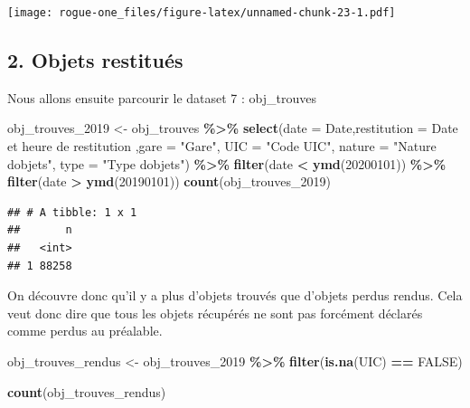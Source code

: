 \documentclass[
]{article}
\newenvironment{Shaded}{\begin{snugshade}}{\end{snugshade}}
\newcommand{\AttributeTok}[1]{\textcolor[rgb]{0.13,0.29,0.53}{#1}}
\newcommand{\ConstantTok}[1]{\textcolor[rgb]{0.56,0.35,0.01}{#1}}
\newcommand{\DecValTok}[1]{\textcolor[rgb]{0.00,0.00,0.81}{#1}}
\newcommand{\FunctionTok}[1]{\textcolor[rgb]{0.13,0.29,0.53}{\textbf{#1}}}
\newcommand{\NormalTok}[1]{#1}
\newcommand{\OtherTok}[1]{\textcolor[rgb]{0.56,0.35,0.01}{#1}}
\newcommand{\SpecialCharTok}[1]{\textcolor[rgb]{0.81,0.36,0.00}{\textbf{#1}}}
\newcommand{\StringTok}[1]{\textcolor[rgb]{0.31,0.60,0.02}{#1}}
\begin{document}
\texttt{[image: rogue-one\_files/figure-latex/unnamed-chunk-23-1.pdf]}

\hypertarget{objets-restituuxe9s}{%
\subsection{2. Objets restitués}\label{objets-restituuxe9s}}

Nous allons ensuite parcourir le dataset 7 : obj\_trouves

\begin{Shaded}
\begin{Highlighting}[]
\NormalTok{obj\_trouves\_2019 }\OtherTok{\textless{}{-}}\NormalTok{ obj\_trouves }\SpecialCharTok{\%\textgreater{}\%}
  \FunctionTok{select}\NormalTok{(}\AttributeTok{date =} \StringTok{\textasciigrave{}}\AttributeTok{Date}\StringTok{\textasciigrave{}}\NormalTok{,}\AttributeTok{restitution =} \StringTok{\textasciigrave{}}\AttributeTok{Date et heure de restitution}\StringTok{\textasciigrave{}}\NormalTok{ ,}\AttributeTok{gare =} \StringTok{"Gare"}\NormalTok{, }\AttributeTok{UIC =} \StringTok{"Code UIC"}\NormalTok{, }\AttributeTok{nature =} \StringTok{"Nature d\textquotesingle{}objets"}\NormalTok{, }\AttributeTok{type =} \StringTok{"Type d\textquotesingle{}objets"}\NormalTok{) }\SpecialCharTok{\%\textgreater{}\%}
  \FunctionTok{filter}\NormalTok{(date }\SpecialCharTok{\textless{}} \FunctionTok{ymd}\NormalTok{(}\DecValTok{20200101}\NormalTok{)) }\SpecialCharTok{\%\textgreater{}\%} 
  \FunctionTok{filter}\NormalTok{(date }\SpecialCharTok{\textgreater{}} \FunctionTok{ymd}\NormalTok{(}\DecValTok{20190101}\NormalTok{))}
\FunctionTok{count}\NormalTok{(obj\_trouves\_2019)}
\end{Highlighting}
\end{Shaded}

\begin{verbatim}
## # A tibble: 1 x 1
##       n
##   <int>
## 1 88258
\end{verbatim}

On découvre donc qu'il y a plus d'objets trouvés que d'objets perdus
rendus. Cela veut donc dire que tous les objets récupérés ne sont pas
forcément déclarés comme perdus au préalable.

\begin{Shaded}
\begin{Highlighting}[]
\NormalTok{obj\_trouves\_rendus }\OtherTok{\textless{}{-}}\NormalTok{ obj\_trouves\_2019 }\SpecialCharTok{\%\textgreater{}\%}
  \FunctionTok{filter}\NormalTok{(}\FunctionTok{is.na}\NormalTok{(UIC) }\SpecialCharTok{==} \ConstantTok{FALSE}\NormalTok{)}

\FunctionTok{count}\NormalTok{(obj\_trouves\_rendus)}
\end{Highlighting}
\end{Shaded}
\end{document}
